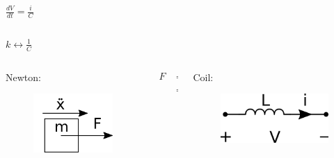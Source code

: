 \begin{frame}
\begin{columns}
		\begin{column}{0.25\linewidth}
			\hspace{3pt}
			$\frac{dV}{dt} = \frac{i}{C}$
		\end{column}
		
	\end{columns}
	
	\begin{center}
		$\boxed{k \leftrightarrow \frac{1}{C}} $	
	\end{center}
	
	\pause
	
	\begin{columns}
		\begin{column}{0.25\linewidth}
			Newton:
			\begin{figure}
				\includegraphics[width=1\linewidth]{img/newton}
			\end{figure}
		\end{column}
		
		\begin{column}{0.25\linewidth}
			\hspace{3pt}
			\begin{align*}
			F &= m \ddot{x} \\ 
			&= m \frac{d\dot{x}}{dt}
			\end{align*} 
		\end{column}
		
		\begin{column}{0.25\linewidth}
			Coil:
			\begin{figure}
				\includegraphics[width=1\linewidth]{img/coil}
				\label{fig:coil}
			\end{figure}
		\end{column}
		

\end{columns}
\end{frame}
